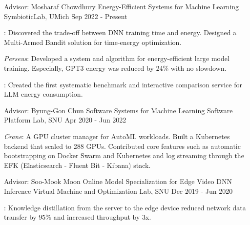 

\begin{cventries}

  \cventryexp
    {Advisor: Mosharaf Chowdhury}
    {Energy-Efficient Systems for Machine Learning}
    {SymbioticLab, UMich}
    {Sep 2022 - Present}
    {
      \begin{cvitems}
        \item {\href{https://ml.energy/zeus}{}: Discovered the trade-off between DNN training time and energy. Designed a Multi-Armed Bandit solution for time-energy optimization.}
        \item {\textit{Perseus}: Developed a system and algorithm for energy-efficient large model training. Especially, GPT3 energy was reduced by 24\% with no slowdown.}
        \item {\href{https://ml.energy/leaderboard}{}: Created the first systematic benchmark and interactive comparison service for LLM energy consumption.}
      \end{cvitems}
    }
    
  \cventryexp
    {Advisor: Byung-Gon Chun}
    {Software Systems for Machine Learning}
    {Software Platform Lab, SNU}
    {Apr 2020 - Jun 2022}
    {
      \begin{cvitems}
        \item {\textit{Crane}: A GPU cluster manager for AutoML workloads. Built a Kubernetes backend that scaled to 288 GPUs. Contributed core features such as automatic bootstrapping on Docker Swarm and Kubernetes and log streaming through the EFK (Elasticsearch - Fluent Bit - Kibana) stack.}
      \end{cvitems}
    }
    
  \cventryexp
    {Advisor: Soo-Mook Moon}
    {Online Model Specialization for Edge Video DNN Inference}
    {Virtual Machine and Optimization Lab, SNU}
    {Dec 2019 - Jun 2020}
    {
      \begin{cvitems}
      \item {\href{https://github.com/jaywonchung/shadowtutor}{}: Knowledge distillation from the server to the edge device reduced network data transfer by 95\% and increased throughput by 3x.}
      \end{cvitems}
    }
    

\end{cventries}
